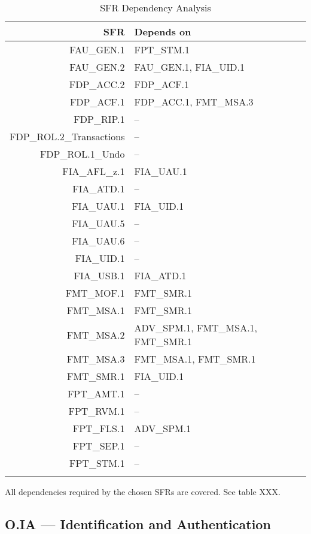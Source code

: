 \documentclass[12pt,english]{scrbook}
\begin{document}
\begin{longtable}{rp{8cm}}
        \toprule
        SFR                 &   Depends on  \\
        \midrule\endhead
FAU\_GEN.1                  &   FPT\_STM.1   \\
FAU\_GEN.2                  &   FAU\_GEN.1, FIA\_UID.1 \\
FDP\_ACC.2                  &   FDP\_ACF.1 \\
FDP\_ACF.1                  &   FDP\_ACC.1, FMT\_MSA.3 \\
FDP\_RIP.1                  &   -- \\
FDP\_ROL.2\_Transactions    &   -- \\
FDP\_ROL.1\_Undo            &   -- \\
FIA\_AFL\_z.1               &   FIA\_UAU.1 \\
FIA\_ATD.1                  &   -- \\
FIA\_UAU.1                  &   FIA\_UID.1 \\
FIA\_UAU.5                  &   -- \\
FIA\_UAU.6                  &   -- \\
FIA\_UID.1                  &   -- \\
FIA\_USB.1                  &   FIA\_ATD.1 \\
FMT\_MOF.1                  &   FMT\_SMR.1 \\
FMT\_MSA.1                  &   FMT\_SMR.1 \\
FMT\_MSA.2                  &   ADV\_SPM.1, FMT\_MSA.1, FMT\_SMR.1 \\
FMT\_MSA.3                  &   FMT\_MSA.1, FMT\_SMR.1 \\
FMT\_SMR.1                  &   FIA\_UID.1 \\
FPT\_AMT.1                  &   -- \\
FPT\_RVM.1                  &   -- \\
FPT\_FLS.1                  &   ADV\_SPM.1 \\
FPT\_SEP.1                  &   -- \\
FPT\_STM.1                  &   -- \\
\bottomrule
   \caption{SFR Dependency Analysis}
\end{longtable}

All dependencies required by the chosen SFRs are covered. See table XXX.

\subsection{O.IA --- Identification and Authentication}
\end{document}
